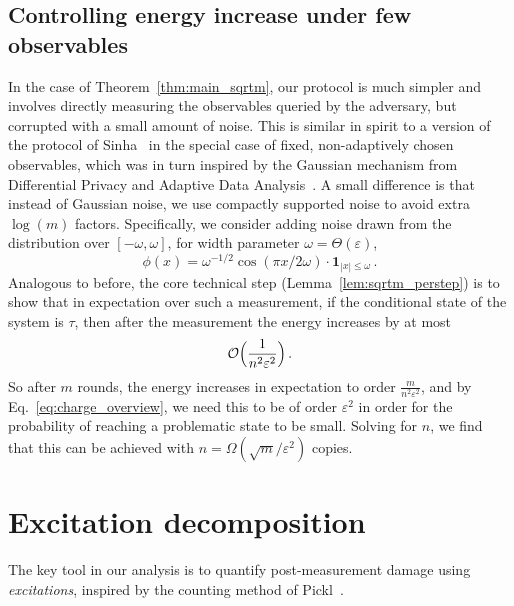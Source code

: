 \documentclass[10pt]{article}
\renewcommand{\epsilon}{\varepsilon}
\begin{document}
\subsection{Controlling energy increase under few observables}
In the case of Theorem~\ref{thm:main_sqrtm}, our protocol is much simpler and involves directly measuring the observables queried by the adversary, but corrupted with a small amount of noise. This is similar in spirit to a version of the protocol of Sinha~\cite{Sin25} in the special case of fixed, non-adaptively chosen observables, which was in turn inspired by the Gaussian mechanism from Differential Privacy and Adaptive Data Analysis~\cite{dwork2006our,bassily2021algorithmic}. A small difference is that instead of Gaussian noise, we use compactly supported noise to avoid extra $\log(m)$ factors. Specifically, we consider adding noise drawn from the distribution over $[-\omega,\omega]$, for width parameter $\omega = \Theta(\epsilon)$,
\begin{equation}
    \phi(x) = \omega^{-1/2}\cos(\pi x/2\omega)\cdot \mathbf{1}_{|x|\le \omega}\,.
\end{equation}
Analogous to before, the core technical step (Lemma~\ref{lem:sqrtm_perstep}) is to show that in expectation over such a measurement, if the conditional state of the system is $\tau$, then after the measurement the energy increases by at most
\begin{equation}
    \mathcal{O}\Bigl(\frac{1}{n^2\epsilon^2}\Bigr)\,.
\end{equation}
So after $m$ rounds, the energy increases in expectation to order $\frac{m}{n^2\epsilon^2}$, and by Eq.~\eqref{eq:charge_overview}, we need this to be of order $\epsilon^2$ in order for the probability of reaching a problematic state to be small. Solving for $n$, we find that this can be achieved with $n = \Omega(\sqrt{m}/\epsilon^2)$ copies.

\section{Excitation decomposition}
\label{sec:pickl}

The key tool in our analysis is to quantify post-measurement damage using \emph{excitations}, inspired by the counting method of Pickl~\cite{pickl2011simple}.
\end{document}
